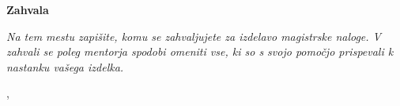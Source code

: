 \thispagestyle{empty}

\begin{center}
{\Large \textbf{\sc Zahvala}}
\end{center}
\vspace{0.5cm}

{\it\noindent
Na tem mestu zapišite, komu se zahvaljujete za izdelavo magistrske naloge. V zahvali se poleg mentorja spodobi omeniti vse, ki so s svojo pomočjo prispevali k nastanku vašega izdelka.

\vspace{0.5cm} \hfill \myname, \myyear
}